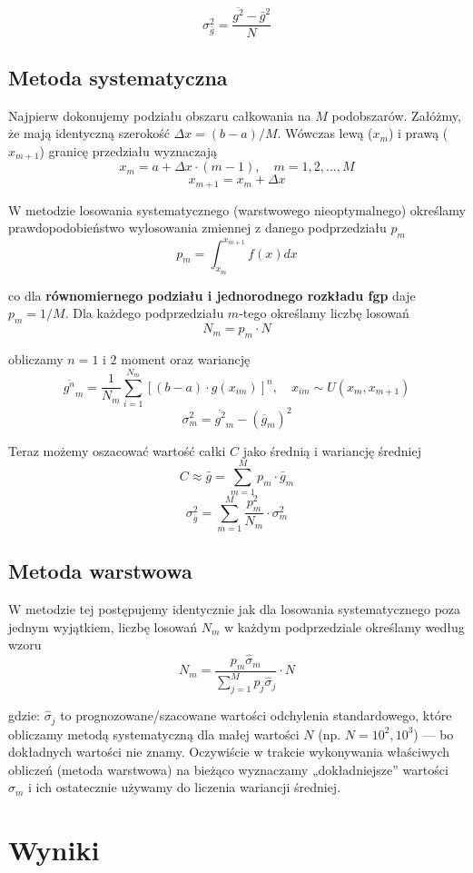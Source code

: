 \documentclass[a4paper,12pt,twoside]{article}
\begin{document}
\[
\sigma^2_{\bar{g}} = \frac{\overline{g^2} - \bar{g}^2}{N}
\]

\subsection{Metoda systematyczna}


Najpierw dokonujemy podziału obszaru całkowania na $M$ podobszarów. Załóżmy, że mają identyczną szerokość $\Delta x = (b - a)/M$. Wówczas lewą ($x_m$) i prawą ($x_{m+1}$) granicę przedziału wyznaczają
\[
x_m = a + \Delta x \cdot (m - 1), \quad m = 1, 2, \ldots, M
\]
\[
x_{m+1} = x_m + \Delta x
\]

W metodzie losowania systematycznego (warstwowego nieoptymalnego) określamy prawdopodobieństwo wylosowania zmiennej z danego podprzedziału $p_m$
\[
p_m = \int_{x_m}^{x_{m+1}} f(x) dx
\]

co dla \textbf{równomiernego podziału i jednorodnego rozkładu fgp} daje $p_m = 1/M$. Dla każdego podprzedziału $m$-tego określamy liczbę losowań
\[
N_m = p_m \cdot N
\]

obliczamy $n = 1$ i $2$ moment oraz wariancję
\[
\overline{g^n}_m = \frac{1}{N_m} \sum_{i=1}^{N_m} [(b - a) \cdot g(x_{im})]^n, \quad x_{im} \sim U(x_m, x_{m+1})
\]
\[
\sigma^2_m = \overline{g^2}_m - (\overline{g}_m)^2
\]

Teraz możemy oszacować wartość całki $C$ jako średnią i wariancję średniej
\[
C \approx \bar{g} = \sum_{m=1}^M p_m \cdot \bar{g}_m
\]
\[
\sigma^2_{\bar{g}} = \sum_{m=1}^M \frac{p_m^2}{N_m} \cdot \sigma^2_m
\]

\subsection{Metoda warstwowa}

W metodzie tej postępujemy identycznie jak dla losowania systematycznego poza jednym wyjątkiem, liczbę losowań $N_m$ w każdym podprzedziale określamy według wzoru
\[
N_m = \frac{p_m \hat{\sigma}_m}{\sum_{j=1}^M p_j \hat{\sigma}_j} \cdot N
\]

gdzie: $\hat{\sigma}_j$ to prognozowane/szacowane wartości odchylenia standardowego, które obliczamy metodą systematyczną dla małej wartości $N$ (np. $N = 10^2, 10^3$) — bo dokładnych wartości nie znamy. Oczywiście w trakcie wykonywania właściwych obliczeń (metoda warstwowa) na bieżąco wyznaczamy „dokładniejsze” wartości $\sigma_m$ i ich ostatecznie używamy do liczenia wariancji średniej.

\section{Wyniki}
\end{document}
